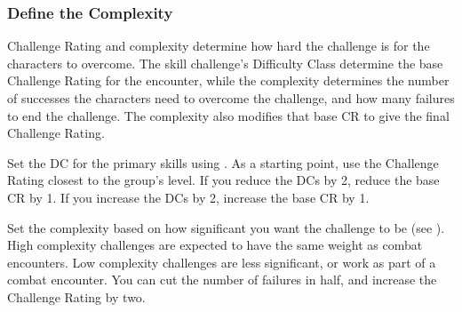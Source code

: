 \subsubsection{Define the Complexity}
Challenge Rating and complexity determine how hard the challenge is for the characters to overcome. The skill challenge's Difficulty Class determine the base Challenge Rating for the encounter, while the complexity determines the number of successes the characters need to overcome the challenge, and how many failures to end the challenge. The complexity also modifies that base CR to give the final Challenge Rating.

Set the DC for the primary skills using . As a starting point, use the Challenge Rating closest to the group's level. If you reduce the DCs by 2, reduce the base CR by 1. If you increase the DCs by 2, increase the base CR by 1.


Set the complexity based on how significant you want the challenge to be (see ). High complexity challenges are expected to have the same weight as combat encounters. Low complexity challenges are less significant, or work as part of a combat encounter. You can cut the number of failures in half, and increase the Challenge Rating by two.


